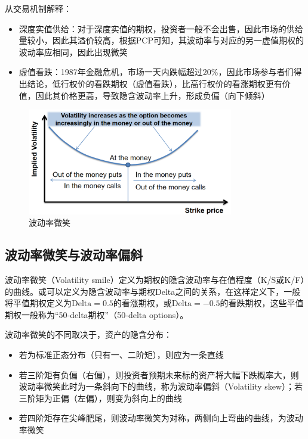 \documentclass[11pt]{article}
\begin{document}
从交易机制解释：
\begin{itemize}
    \item 深度实值供给：对于深度实值的期权，投资者一般不会出售，因此市场的供给量较小，因此其溢价较高，根据PCP可知，其波动率与对应的另一虚值期权的波动率应相同，因此出现微笑
    \item 虚值看跌：1987年金融危机，市场一天内跌幅超过20\%，因此市场参与者们得出结论，低行权价的看跌期权（虚值看跌），比高行权价的看涨期权更有价值，因此其价格更高，导致隐含波动率上升，形成负偏（向下倾斜）
\end{itemize}

\begin{figure}[H]
    \centering
    \includegraphics[width=0.8\textwidth]{fig/volatility-smile.png}
    \caption{波动率微笑}
    \label{fig:volatility-smile}
\end{figure}

\subsection{波动率微笑与波动率偏斜}

波动率微笑（Volatility smile）定义为期权的隐含波动率与在值程度（K/S或K/F）的曲线。或可以定义为隐含波动率与期权Delta之间的关系，在这样定义下，一般将平值期权定义为$\text{Delta}=0.5$的看涨期权，或$\text{Delta}=-0.5$的看跌期权，这些平值期权一般称为“50-delta期权”（50-delta options）。

波动率微笑的不同取决于，资产的隐含分布：
\begin{itemize}
    \item 若为标准正态分布（只有一、二阶矩），则应为一条直线
    \item 若三阶矩有负偏（右偏），则投资者预期未来标的资产将大幅下跌概率大，则波动率微笑此时为一条斜向下的曲线，称为波动率偏斜（Volatility skew）；若三阶矩为正偏（左偏），则变为斜向上的曲线
    \item 若四阶矩存在尖峰肥尾，则波动率微笑为对称，两侧向上弯曲的曲线，为波动率微笑
\end{itemize}
\end{document}

